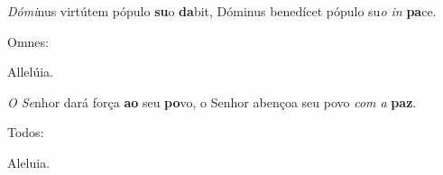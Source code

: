 \begin{greenumerate}
  \setcounter{enumi}{1}


  \item \textit{Dómi}nus virtútem pópulo \textbf{su}o \textbf{da}bit, {\GreStar} Dóminus benedícet pópulo su\textit{o in} \textbf{pa}ce. \begin{rubrica}Omnes:\end{rubrica} Allelúia.

  \switchcolumn\setcounter{enumi}{1}

  \item \textit{O Se}nhor dará força \textbf{ao} seu \textbf{po}vo, {\GreStar} o Senhor abençoa seu povo \textit{com a} \textbf{paz}. \begin{rubrica}Todos:\end{rubrica} Aleluia.
\end{greenumerate}